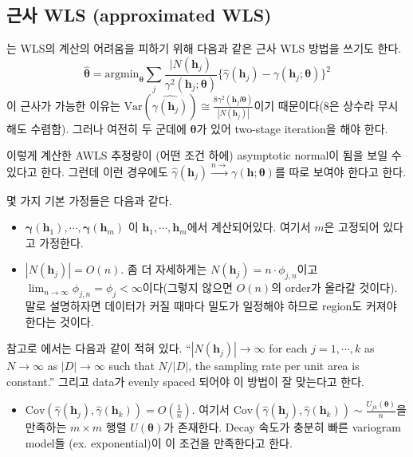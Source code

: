 \documentclass[b5paper,]{scrbook}
\providecommand{\tightlist}{%
  \setlength{\itemsep}{0pt}\setlength{\parskip}{0pt}}
\theoremstyle{plain}
\theoremstyle{definition}
\numberwithin{equation}{section}
\begin{document}
\subsection{근사 WLS (approximated WLS)}\label{-wls-approximated-wls}

\citep{Cressie1985}는 WLS의 계산의 어려움을 피하기 위해 다음과 같은 근사
WLS 방법을 쓰기도 한다.
\[\hat{\boldsymbol{\theta}}=\text{argmin}_{\boldsymbol{\theta}}\sum_{j}\frac{|N(\mathbf{h}_{j})}{\gamma^{2}(\mathbf{h}_{j};\boldsymbol{\theta})}\{ \hat{\gamma}(\mathbf{h}_{j})-\gamma(\mathbf{h}_{j};\boldsymbol{\theta}) \}^{2}\]
이 근사가 가능한 이유는
\(\text{Var}(\hat{\gamma(\mathbf{h}_{j})}) \cong \frac{8 \gamma^{2}(\mathbf{h}_{j}l\boldsymbol{\theta})}{|N(\mathbf{h}_{j})|}\)이기
때문이다(8은 상수라 무시해도 수렴함). 그러나 여전히 두 군데에
\(\boldsymbol{\theta}\)가 있어 two-stage iteration을 해야 한다.

이렇게 계산한 AWLS 추정량이 (어떤 조건 하에) asymptotic normal이 됨을
보일 수 있다고 한다. 그런데 이런 경우에도
\(\hat{\gamma}(\mathbf{h}_{j}) \stackrel{n \rightarrow}{\rightarrow} \gamma(\mathbf{h};\boldsymbol{\theta})\)를
따로 보여야 한다고 한다.

몇 가지 기본 가정들은 다음과 같다.

\begin{itemize}
\item
  \(\mathbf{\gamma}(\mathbf{h}_{1}), \cdots , \mathbf{\gamma}(\mathbf{h}_{m})\)
  이 \(\mathbf{h}_{1}, \cdots , \mathbf{h}_{m}\)에서 계산되어있다.
  여기서 \(m\)은 고정되어 있다고 가정한다.
\item
  \(|N(\mathbf{h}_{j})|=O(n)\). 좀 더 자세하게는
  \(N(\mathbf{h}_{j})=n\cdot \phi_{j,n}\)이고
  \(\lim_{n \rightarrow \infty}\phi_{j,n}=\phi_{j} < \infty\)이다(그렇지
  않으면 \(O(n)\)의 order가 올라갈 것이다). 말로 설명하자면 데이터가
  커질 때마다 밀도가 일정해야 하므로 region도 커져야 한다는 것이다.
\end{itemize}

참고로 \citep{Cressie1985}에서는 다음과 같이 적혀 있다.
``\(|N(\mathbf{h}_{j})| \rightarrow \infty\) for each \(j=1, \cdots, k\)
as \(N \rightarrow \infty\) as \(|D| \rightarrow \infty\) such that
\(N/|D|\), the sampling rate per unit area is constant.'' 그리고 data가
evenly spaced 되어야 이 방법이 잘 맞는다고 한다.

\begin{itemize}
\tightlist
\item
  \(\text{Cov}(\hat{\gamma}(\mathbf{h}_{j}), \hat{\gamma}(\mathbf{h}_{k}))=O(\frac{1}{n})\).
  여기서
  \(\text{Cov}(\hat{\gamma}(\mathbf{h}_{j}), \hat{\gamma}(\mathbf{h}_{k})) \sim \frac{U_{jk}(\boldsymbol{\theta})}{n}\)을
  만족하는 \(m \times m\) 행렬 \(U(\boldsymbol{\theta})\)가 존재한다.
  Decay 속도가 충분히 빠른 variogram model들 (ex. exponential)이 이
  조건을 만족한다고 한다.
\end{itemize}
\end{document}

